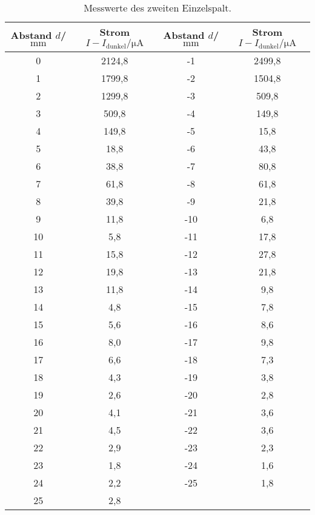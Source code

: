 \begin{table}
  \centering
  \caption{Messwerte des zweiten Einzelspalt.}
  \label{tab:spalt2}
  \begin{tabular}{c c c c}
Abstand $d$/$\si{\milli\meter}$ & Strom $I-I_\mathrm{dunkel}/\si{\micro\ampere}$&Abstand $d$/$\si{\milli\meter}$ & Strom $I-I_\mathrm{dunkel}/\si{\micro\ampere}$\\
  \midrule
  0  & 2124,8 & -1  & 2499,8\\
  1  & 1799,8 & -2  & 1504,8\\
  2  & 1299,8 & -3  & 509,8 \\
  3  & 509,8  & -4  & 149,8 \\
  4  & 149,8  & -5  & 15,8  \\
  5  &  18,8  & -6  & 43,8  \\
  6  & 38,8   & -7  & 80,8  \\
  7  & 61,8   & -8  & 61,8  \\
  8  & 39,8   & -9  & 21,8  \\
  9  & 11,8   & -10 & 6,8   \\
  10 & 5,8    & -11 & 17,8\\
  11 & 15,8   & -12 & 27,8\\
  12 & 19,8   & -13 & 21,8\\
  13 & 11,8   & -14 & 9,8     \\
  14 & 4,8    & -15 & 7,8     \\
  15 & 5,6    & -16 & 8,6     \\
  16 & 8,0    & -17 & 9,8   \\
  17 & 6,6    & -18 & 7,3   \\
  18 & 4,3    & -19 & 3,8   \\
  19 & 2,6    & -20 & 2,8       \\
  20 & 4,1    & -21 & 3,6       \\
  21 & 4,5    & -22 & 3,6       \\
  22 & 2,9    & -23 & 2,3     \\
  23 & 1,8    & -24 & 1,6     \\
  24 & 2,2    & -25 & 1,8 \\
  25 & 2,8    & &\\
  \bottomrule
  \end{tabular}
\end{table}
\FloatBarrier
